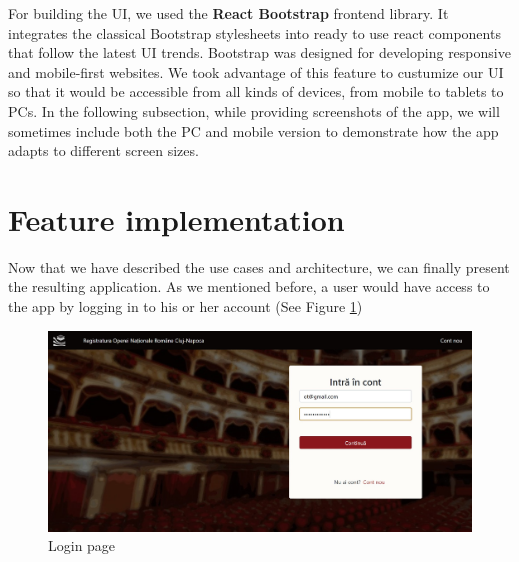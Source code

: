 For building the UI, we used the \textbf{React Bootstrap} frontend library. It integrates the classical Bootstrap stylesheets into ready to use react components that follow the latest UI trends. Bootstrap was designed for developing responsive and mobile-first websites. We took advantage of this feature to custumize our UI so that it would be accessible from all kinds of devices, from mobile to tablets to PCs. In the following subsection, while providing screenshots of the app, we will sometimes include both the PC and mobile version to demonstrate how the app adapts to different screen sizes.



\section{Feature implementation}
\label{section:featureImplementation}

Now that we have described the use cases and architecture, we can finally present the resulting application. As we mentioned before, a user would have access to the app by logging in to his or her account (See Figure \ref{login})

\begin{figure}[ht]
    \centering
    \includegraphics[width=5.5in]{images/app/login_filled}
    \caption{Login page}
    \label{login}
\end{figure}

